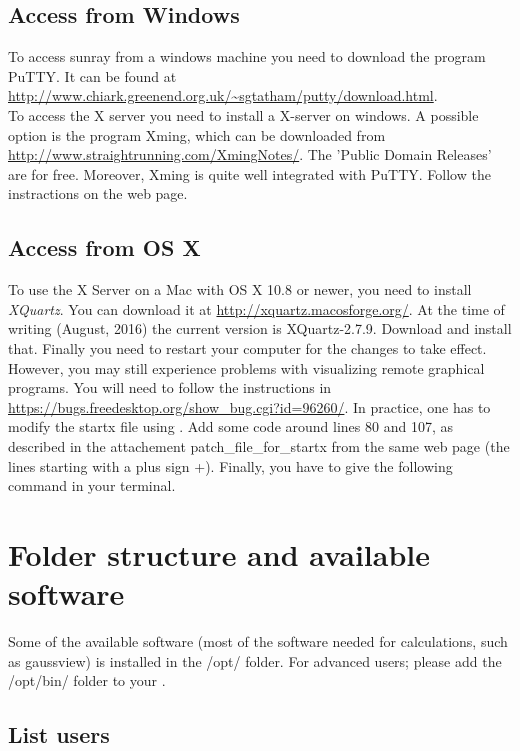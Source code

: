 \documentclass{article}
\begin{document}
\subsection{Access from Windows}

To access sunray from a windows machine you need to download the program PuTTY. It can be found at \url{http://www.chiark.greenend.org.uk/~sgtatham/putty/download.html}.\\

To access the X server you need to install a X-server on windows.
A possible option is the program Xming, which can be downloaded from \url{http://www.straightrunning.com/XmingNotes/}. The 'Public Domain Releases' are for free.
Moreover, Xming is quite well integrated with PuTTY. Follow the instractions on the web page.


\subsection{Access from OS X}

To use the X Server on a Mac with OS X 10.8 or newer, you need to install \emph{XQuartz}.
You can download it at \url{http://xquartz.macosforge.org/}.
At the time of writing (August, 2016) the current version is XQuartz-2.7.9.
Download and install that.
Finally you need to restart your computer for the changes to take effect.
However, you may still experience problems with visualizing remote graphical programs.
You will need to follow the instructions in \url{https://bugs.freedesktop.org/show_bug.cgi?id=96260/}.
In practice, one has to modify the startx file using .
Add some code around lines 80 and 107, as described in the attachement patch\_file\_for\_startx from the same web page (the lines starting with a plus sign +).
Finally, you have to give the following command  in your terminal.


\newpage
\section{Folder structure and available software}

Some of the available software (most of the software needed for calculations, such as gaussview) is installed in the /opt/ folder.
For advanced users; please add the /opt/bin/ folder to your .\\

\subsection*{List users}
\end{document}
